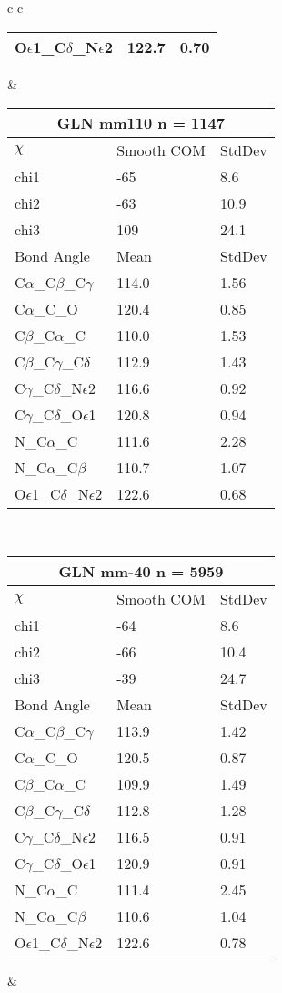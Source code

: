 \begin{longtable}{ c c }
\begin{tabular}{ l l l }
  O$\epsilon$1\_C$\delta$\_N$\epsilon$2 & 122.7 & 0.70\\
  \bottomrule
  \end{tabular}
  &
  \begin{tabular}{ l l l }
  \toprule
  \multicolumn{3}{c}{GLN \textbf{mm110} n = 1147} \\ \toprule
  $\chi$       & Smooth COM & StdDev \\ \midrule
  chi1 & -65 & 8.6 \\ 
  chi2 & -63 & 10.9 \\ 
  chi3 & 109 & 24.1 \\ \midrule
  Bond Angle   & Mean     & StdDev \\ \midrule
  C$\alpha$\_C$\beta$\_C$\gamma$ & 114.0 & 1.56\\
  C$\alpha$\_C\_O & 120.4 & 0.85\\
  C$\beta$\_C$\alpha$\_C & 110.0 & 1.53\\
  C$\beta$\_C$\gamma$\_C$\delta$ & 112.9 & 1.43\\
  C$\gamma$\_C$\delta$\_N$\epsilon$2 & 116.6 & 0.92\\
  C$\gamma$\_C$\delta$\_O$\epsilon$1 & 120.8 & 0.94\\
  N\_C$\alpha$\_C & 111.6 & 2.28\\
  N\_C$\alpha$\_C$\beta$ & 110.7 & 1.07\\
  O$\epsilon$1\_C$\delta$\_N$\epsilon$2 & 122.6 & 0.68\\
  \bottomrule
  \end{tabular}
  \\
  \begin{tabular}{ l l l }
  \toprule
  \multicolumn{3}{c}{GLN \textbf{mm-40} n = 5959} \\ \toprule
  $\chi$       & Smooth COM & StdDev \\ \midrule
  chi1 & -64 & 8.6 \\ 
  chi2 & -66 & 10.4 \\ 
  chi3 & -39 & 24.7 \\ \midrule
  Bond Angle   & Mean     & StdDev \\ \midrule
  C$\alpha$\_C$\beta$\_C$\gamma$ & 113.9 & 1.42\\
  C$\alpha$\_C\_O & 120.5 & 0.87\\
  C$\beta$\_C$\alpha$\_C & 109.9 & 1.49\\
  C$\beta$\_C$\gamma$\_C$\delta$ & 112.8 & 1.28\\
  C$\gamma$\_C$\delta$\_N$\epsilon$2 & 116.5 & 0.91\\
  C$\gamma$\_C$\delta$\_O$\epsilon$1 & 120.9 & 0.91\\
  N\_C$\alpha$\_C & 111.4 & 2.45\\
  N\_C$\alpha$\_C$\beta$ & 110.6 & 1.04\\
  O$\epsilon$1\_C$\delta$\_N$\epsilon$2 & 122.6 & 0.78\\
  \bottomrule
  \end{tabular}
  &
  \\
  
\end{longtable}

